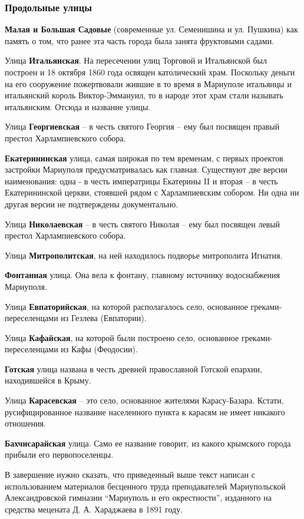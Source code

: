 \subsubsection{Продольные улицы}

\textbf{Малая и Большая Садовые} (современные ул. Семенишина и ул. Пушкина) как память о
том, что ранее эта часть города была занята фруктовыми садами.

Улица \textbf{Итальянская}. На пересечении улиц Торговой и Итальянской был построен  и
18 октября 1860 года освящен католический храм. Поскольку деньги на его
сооружение пожертвовали жившие в то время в Мариуполе итальянцы и итальянский
король Виктор-Эммануил, то в народе этот храм стали называть итальянским.
Отсюда и название улицы.

Улица \textbf{Георгиевская} – в честь святого Георгия – ему был посвящен правый престол
Харлампиевского собора.

\textbf{Екатерининская} улица, самая широкая по тем временам, с первых проектов
застройки Мариуполя предусматривалась как главная. Существуют две версии
наименования: одна - в честь императрицы Екатерины II и вторая – в честь
Екатерининской церкви, стоявшей рядом с Харлампиевским собором. Ни одна ни
другая версии не подтверждены документально.

Улица \textbf{Николаевская} – в честь святого Николая – ему был посвящен левый престол Харлампиевского собора.

Улица \textbf{Митрополитская}, на ней находилось подворье митрополита Игнатия.

\textbf{Фонтанная} улица. Она вела к фонтану, главному источнику водоснабжения Мариуполя.

Улица \textbf{Евпаторийская}, на которой располагалось село, основанное  греками-переселенцами из Гезлева (Евпатории).

Улица \textbf{Кафайская}, на которой были построено село, основанное  греками-переселенцами из Кафы (Феодосии).

\textbf{Готская} улица названа в честь древней  православной Готской епархии, находившейся  в Крыму.

Улица \textbf{Карасевская} – это село, основанное жителями Карасу-Базара.
Кстати, русифицированное название населенного пункта к карасям не имеет
никакого отношения.

\textbf{Бахчисарайская} улица. Само ее название говорит, из какого крымского города прибыли его первопоселенцы.

В завершение нужно сказать, что приведенный выше текст написан с использованием
материалов бесценного труда преподавателей Мариупольской Александровской
гимназии \enquote{Мариуполь и его окрестности}, изданного на средства мецената
Д. А. Хараджаева в 1891 году.
